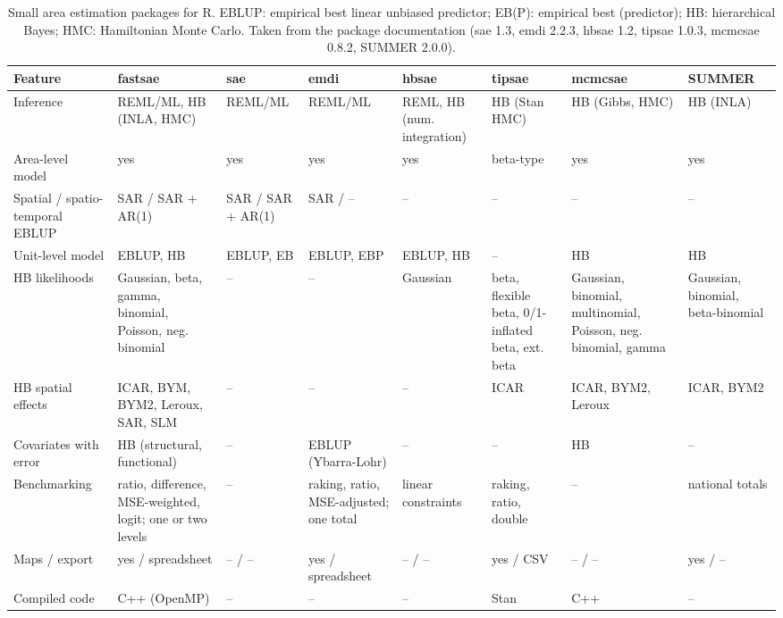 \begin{table}[!h]
\centering
\caption{\label{tab:pkg-comparison}Small area estimation packages for R. EBLUP: empirical best linear unbiased predictor; EB(P): empirical best (predictor); HB: hierarchical Bayes; HMC: Hamiltonian Monte Carlo. Taken from the package documentation (sae 1.3, emdi 2.2.3, hbsae 1.2, tipsae 1.0.3, mcmcsae 0.8.2, SUMMER 2.0.0).}
\centering
\fontsize{7}{9}\selectfont
\begin{tabular}[t]{>{\raggedright\arraybackslash}p{2.2cm}>{\raggedright\arraybackslash}p{1.75cm}>{\raggedright\arraybackslash}p{1.75cm}>{\raggedright\arraybackslash}p{1.75cm}>{\raggedright\arraybackslash}p{1.75cm}>{\raggedright\arraybackslash}p{1.75cm}>{\raggedright\arraybackslash}p{1.75cm}>{\raggedright\arraybackslash}p{1.75cm}}
\toprule
Feature & fastsae & sae & emdi & hbsae & tipsae & mcmcsae & SUMMER\\
\midrule
Inference & REML/ML, HB (INLA, HMC) & REML/ML & REML/ML & REML, HB (num. integration) & HB (Stan HMC) & HB (Gibbs, HMC) & HB (INLA)\\
Area-level model & yes & yes & yes & yes & beta-type & yes & yes\\
Spatial / spatio-temporal EBLUP & SAR / SAR + AR(1) & SAR / SAR + AR(1) & SAR / -- & -- & -- & -- & --\\
Unit-level model & EBLUP, HB & EBLUP, EB & EBLUP, EBP & EBLUP, HB & -- & HB & HB\\
HB likelihoods & Gaussian, beta, gamma, binomial, Poisson, neg. binomial & -- & -- & Gaussian & beta, flexible beta, 0/1-inflated beta, ext. beta & Gaussian, binomial, multinomial, Poisson, neg. binomial, gamma & Gaussian, binomial, beta-binomial\\
HB spatial effects & ICAR, BYM, BYM2, Leroux, SAR, SLM & -- & -- & -- & ICAR & ICAR, BYM2, Leroux & ICAR, BYM2\\
Covariates with error & HB (structural, functional) & -- & EBLUP (Ybarra-Lohr) & -- & -- & HB & --\\
Benchmarking & ratio, difference, MSE-weighted, logit; one or two levels & -- & raking, ratio, MSE-adjusted; one total & linear constraints & raking, ratio, double & -- & national totals\\
Maps / export & yes / spreadsheet & -- / -- & yes / spreadsheet & -- / -- & yes / CSV & -- / -- & yes / --\\
Compiled code & C++ (OpenMP) & -- & -- & -- & Stan & C++ & --\\
\bottomrule
\end{tabular}
\end{table}

